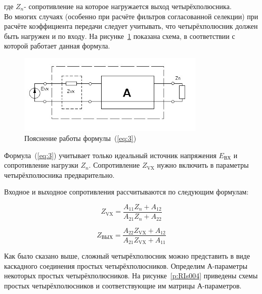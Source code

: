 где $Z_{n}$- сопротивление на которое нагружается выход четырёхполюсника.
\\

Во  многих  случаях  (особенно  при  расчёте  фильтров  согласованной селекции)  при  расчёте  коэффициента  передачи  следует  учитывать,  что  четырёхполюсник должен быть нагружен и по входу. На рисунке~\ref{p:RIs003} показана схема, в соответствии с которой работает данная формула.  

\begin{figure}[H] \centering
  \includegraphics[width=0.8\textwidth]{./content/RIs003.jpg}
  \caption{Пояснение работы формулы~(\ref{eq:3})} \label{p:RIs003}
\end{figure}



Формула~(\ref{eq:3})  учитывает  только  идеальный источник напряжения $E_{\text{ВХ}}$  и  сопротивление  нагрузки  $Z_{n}$.  Сопротивление  $Z_{\text{VX}}$  нужно  включить  в параметры четырёхполюсника предварительно.  

Входное  и  выходное  сопротивления  рассчитываются  по  следующим формулам:  

\begin{equation}
\label{eq:4}
Z_{\text{VX}} = \frac{A_{11}Z_{n} + A_{12}}{A_{21}Z_{n} + A_{22}}
\end{equation}


\begin{equation}
\label{eq:5}
Z_{\text{ВЫХ}} = \frac{A_{22}Z_{\text{VX}} + A_{12}}{A_{21}Z_{\text{VX}}+ A_{11}}
\end{equation}

Как  было  сказано  выше,  сложный  четырёхполюсник  можно представить  в  виде  каскадного  соединения  простых  четырёхполюсников. Определим  А-параметры  некоторых  простых  четырёхполюсников.  На рисунке~\ref{p:RIs004}  приведены  схемы  простых  четырёхполюсников  и 
соответствующие им матрицы А-параметров. 


